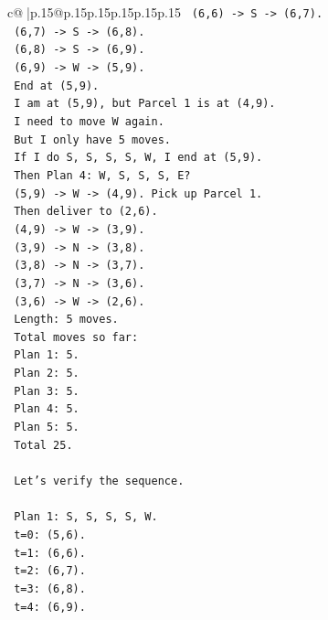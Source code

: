 \documentclass{article}
\begin{document}
{\begin{supertabular}{c@{$\;$}|p{.15\linewidth}@{}p{.15\linewidth}p{.15\linewidth}p{.15\linewidth}p{.15\linewidth}p{.15\linewidth}}
{{{\texttt{      (6,6) {-}> S {-}> (6,7).} \\
\texttt{      (6,7) {-}> S {-}> (6,8).} \\
\texttt{      (6,8) {-}> S {-}> (6,9).} \\
\texttt{      (6,9) {-}> W {-}> (5,9).} \\
\texttt{      End at (5,9).} \\
\texttt{      I am at (5,9), but Parcel 1 is at (4,9).} \\
\texttt{      I need to move W again.} \\
\texttt{      But I only have 5 moves.} \\
\texttt{      If I do S, S, S, S, W, I end at (5,9).} \\
\texttt{      Then Plan 4: W, S, S, S, E?} \\
\texttt{      (5,9) {-}> W {-}> (4,9). Pick up Parcel 1.} \\
\texttt{      Then deliver to (2,6).} \\
\texttt{      (4,9) {-}> W {-}> (3,9).} \\
\texttt{      (3,9) {-}> N {-}> (3,8).} \\
\texttt{      (3,8) {-}> N {-}> (3,7).} \\
\texttt{      (3,7) {-}> N {-}> (3,6).} \\
\texttt{      (3,6) {-}> W {-}> (2,6).} \\
\texttt{      Length: 5 moves.} \\
\texttt{      Total moves so far:} \\
\texttt{      Plan 1: 5.} \\
\texttt{      Plan 2: 5.} \\
\texttt{      Plan 3: 5.} \\
\texttt{      Plan 4: 5.} \\
\texttt{      Plan 5: 5.} \\
\texttt{      Total 25.} \\
\\ 
\texttt{      Let's verify the sequence.} \\
\\ 
\texttt{      Plan 1: S, S, S, S, W.} \\
\texttt{      t=0: (5,6).} \\
\texttt{      t=1: (6,6).} \\
\texttt{      t=2: (6,7).} \\
\texttt{      t=3: (6,8).} \\
\texttt{      t=4: (6,9).} \\
}}}
\end{supertabular}}
\end{document}
